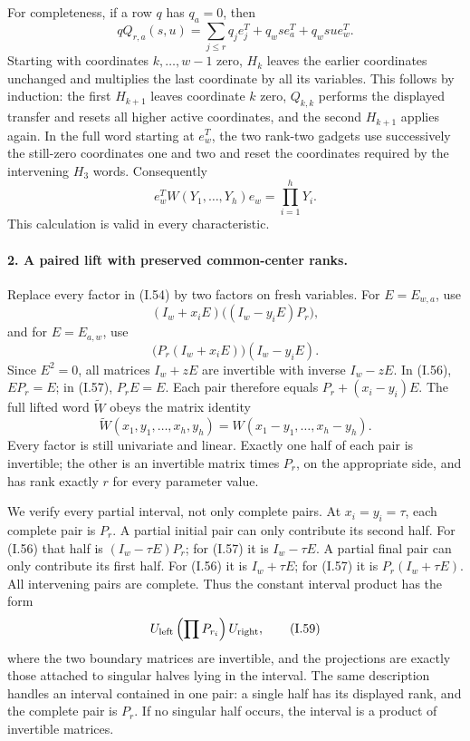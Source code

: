\documentclass[11pt,a4paper]{article}
\theoremstyle{definition}\newtheorem{definition}{Definition}
\begin{document}
For completeness, if a row $q$ has $q_a=0$, then
\[
 qQ_{r,a}(s,u)
   =\sum_{j\leq r}q_j e_j^T
       +q_ws e_a^T+q_wsu e_w^T.
\]
Starting with coordinates $k,\ldots,w-1$ zero, $H_k$ leaves
the earlier coordinates unchanged and multiplies the last
coordinate by all its variables. This follows by induction:
the first $H_{k+1}$ leaves coordinate $k$ zero, $Q_{k,k}$
performs the displayed transfer and resets all higher active
coordinates, and the second $H_{k+1}$ applies again. In the
full word starting at $e_w^T$, the two rank-two gadgets use
successively the still-zero coordinates one and two and reset
the coordinates required by the intervening $H_3$ words.
Consequently
\[
 e_w^T W(Y_1,\ldots,Y_h)e_w=\prod_{i=1}^hY_i.
 \tag{I.55}
\]
This calculation is valid in every characteristic.

\paragraph{2. A paired lift with preserved common-center ranks.}
Replace every factor in (I.54) by two factors on fresh variables.
For $E=E_{w,a}$, use
\[
 (I_w+x_iE)\bigl((I_w-y_iE)P_r\bigr),
 \tag{I.56}
\]
and for $E=E_{a,w}$, use
\[
 \bigl(P_r(I_w+x_iE)\bigr)(I_w-y_iE).
 \tag{I.57}
\]
Since $E^2=0$, all matrices $I_w+zE$ are invertible with
inverse $I_w-zE$. In (I.56), $EP_r=E$; in (I.57),
$P_rE=E$. Each pair therefore equals
$P_r+(x_i-y_i)E$. The full lifted word $\widetilde W$ obeys
the matrix identity
\[
 \widetilde W(x_1,y_1,\ldots,x_h,y_h)
       =W(x_1-y_1,\ldots,x_h-y_h).
 \tag{I.58}
\]
Every factor is still univariate and linear. Exactly one half
of each pair is invertible; the other is an invertible matrix
times $P_r$, on the appropriate side, and has rank exactly $r$
for every parameter value.

We verify every partial interval, not only complete pairs.
At $x_i=y_i=\tau$, each complete pair is $P_r$.
A partial initial pair can only contribute its second half.
For (I.56) that half is $(I_w-\tau E)P_r$; for (I.57) it is
$I_w-\tau E$. A partial final pair can only contribute its
first half. For (I.56) it is $I_w+\tau E$; for (I.57) it is
$P_r(I_w+\tau E)$. All intervening pairs are complete.
Thus the constant interval product has the form
\[
 U_{\rm left}\left(\prod P_{r_i}\right)U_{\rm right},
 \tag{I.59}
\]
where the two boundary matrices are invertible, and the
projections are exactly those attached to singular halves
lying in the interval. The same description handles an
interval contained in one pair: a single half has its
displayed rank, and the complete pair is $P_r$. If no singular
half occurs, the interval is a product of invertible matrices.
\end{document}
